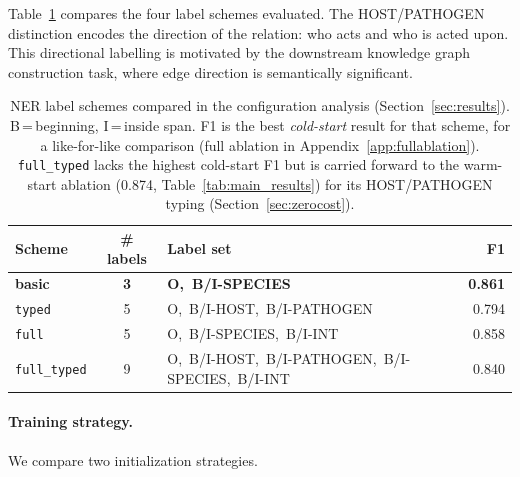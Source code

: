 \documentclass[11pt,twocolumn]{article}
\begin{document}
Table~\ref{tab:ner_schemes} compares the four label schemes evaluated.
The HOST/PATHOGEN distinction encodes the direction of the relation: who acts
and who is acted upon. This directional labelling is motivated by the downstream
knowledge graph construction task, where edge direction is semantically significant.

\begin{table}[!ht]
\centering
\small
\caption{NER label schemes compared in the configuration analysis
(Section~\ref{sec:results}). B\,=\,beginning, I\,=\,inside span.
F1 is the best \emph{cold-start} result for that scheme, for a like-for-like
comparison (full ablation in Appendix~\ref{app:fullablation}). \texttt{full\_typed}
lacks the highest cold-start F1 but is carried forward to the warm-start
ablation (0.874, Table~\ref{tab:main_results}) for its HOST/PATHOGEN typing
(Section~\ref{sec:zerocost}).}
\label{tab:ner_schemes}
\begin{tabular}{lclr}
\toprule
\textbf{Scheme} & \textbf{\# labels} & \textbf{Label set} & \textbf{F1} \\
\midrule
\rowcolor{bestrow}
\textbf{basic}       & \textbf{3} & \textbf{O,\ B/I-SPECIES}                            & \textbf{0.861} \\
\texttt{typed}       & 5 & O,\ B/I-HOST,\ B/I-PATHOGEN                         & 0.794 \\
\texttt{full}        & 5 & O,\ B/I-SPECIES,\ B/I-INT                           & 0.858 \\
\texttt{full\_typed} & 9 & O,\ B/I-HOST,\ B/I-PATHOGEN,\ B/I-SPECIES,\ B/I-INT & 0.840 \\
\bottomrule
\end{tabular}
\end{table}

\paragraph{Training strategy.}
We compare two initialization strategies.
\end{document}
